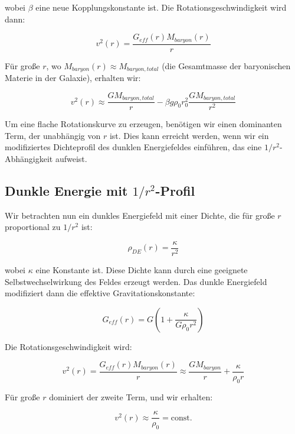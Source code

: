 \documentclass[a4paper,12pt]{article}
\begin{document}
wobei $\beta$ eine neue Kopplungskonstante ist. Die Rotationsgeschwindigkeit wird dann:

\begin{equation}
v^2(r) = \frac{G_{eff}(r)M_{baryon}(r)}{r}
\end{equation}

Für große $r$, wo $M_{baryon}(r) \approx M_{baryon,total}$ (die Gesamtmasse der baryonischen Materie in der Galaxie), erhalten wir:

\begin{equation}
v^2(r) \approx \frac{GM_{baryon,total}}{r} - \beta g\rho_0 r_0^2 \frac{GM_{baryon,total}}{r^2}
\end{equation}

Um eine flache Rotationskurve zu erzeugen, benötigen wir einen dominanten Term, der unabhängig von $r$ ist. Dies kann erreicht werden, wenn wir ein modifiziertes Dichteprofil des dunklen Energiefeldes einführen, das eine $1/r^2$-Abhängigkeit aufweist.

\subsection{Dunkle Energie mit $1/r^2$-Profil}

Wir betrachten nun ein dunkles Energiefeld mit einer Dichte, die für große $r$ proportional zu $1/r^2$ ist:

\begin{equation}
\rho_{DE}(r) = \frac{\kappa}{r^2}
\end{equation}

wobei $\kappa$ eine Konstante ist. Diese Dichte kann durch eine geeignete Selbstwechselwirkung des Feldes erzeugt werden. Das dunkle Energiefeld modifiziert dann die effektive Gravitationskonstante:

\begin{equation}
G_{eff}(r) = G\left(1 + \frac{\kappa}{G\rho_0 r^2}\right)
\end{equation}

Die Rotationsgeschwindigkeit wird:

\begin{equation}
v^2(r) = \frac{G_{eff}(r)M_{baryon}(r)}{r} \approx \frac{GM_{baryon}}{r} + \frac{\kappa}{\rho_0 r}
\end{equation}

Für große $r$ dominiert der zweite Term, und wir erhalten:

\begin{equation}
v^2(r) \approx \frac{\kappa}{\rho_0} = \text{const.}
\end{equation}
\end{document}
